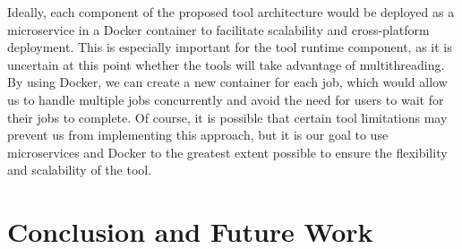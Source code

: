 \documentclass[conference]{IEEEtran}
\begin{document}
Ideally, each component of the proposed tool architecture would be deployed as
a microservice in a Docker container to facilitate scalability and
cross-platform deployment. This is especially important for the tool runtime
component, as it is uncertain at this point whether the tools will take
advantage of multithreading. By using Docker, we can create a new container for
each job, which would allow us to handle multiple jobs concurrently and avoid
the need for users to wait for their jobs to complete. Of course, it is
possible that certain tool limitations may prevent us from implementing this
approach, but it is our goal to use microservices and Docker to the greatest
extent possible to ensure the flexibility and scalability of the tool.

\section{Conclusion and Future Work}




\end{document}
